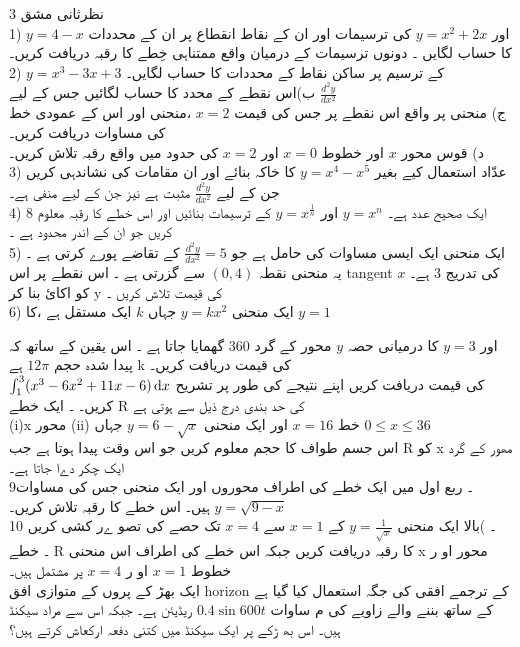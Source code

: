 نظرثانی مشق 3\\

1) 
\(y=4-x\)
اور
\(y=x^{2}+2x\)
کی ترسیمات اور ان کے نقاط انقطاع پر ان کے محددات کا حساب لگایں ۔
دونوں ترسیمات کے درمیان واقع ممتناہی خِطے کا رقبہ دریافت کریں۔\\
2)
\( y=x^{3}-3x+3\) 
کے ترسیم پر ساکن نقاط کے محددات کا حساب لگایں۔\\
ب)اس نقطے کے محدد کا حساب لگائیں جس کے لیے
\(\frac{d^{2}y}{dx^{2}}\)\\
ج) منحنی پر واقع اس نقطے پر جس کی قیمت
\( x=2\)
 ،منحنی اور اس کے عمودی خط کی مساوات دریافت کریں۔\\
 د)  قوس محور
\(x\)
اور خطوط
\(x=0\)
 اور
\(x=2\)
کی حدود میں واقع رقبہ تلاش کریں۔ \\
3)   عدّاد استعمال کیے بغیر 
\(y=x^4-x^5\)
کا خاکہ بنائے اور ان مقامات کی نشاندہی کریں جن کے لیے
 \(\frac{d^{2}y}{dx^{2}}\)
مثبت ہے نیز جن کے لیے منفی ہے۔\\
4)
\(8\)
ایک صحیح عدد ہے۔
\(y=x^{n}\)
اور
\(y=x^{\frac{1}{n}}\)
کے ترسیمات بنائیں اور اس خطے کا رقبہ معلوم کریں جو ان کے اندر محدود ہے ۔\\
5) ایک منحنی ایک ایسی مساوات کی حامل ہے جو
\(\frac{d^{2}y}{dx^{2}}=5\)
کے تقاضے پورے کرتی ہے ۔
یہ منحنی نقطہ
\((0,4)\)
سے گزرتی ہے ۔ اس نقطے پر اس
tangent
کی تدریج
\(3\)
ہے۔
\(x\)
 کو اکائ بنا کر y کی قیمت تلاش کریں ۔\\
6) ایک منحنی
\(y=k x^{2}\) 
 جہاں
\(k\)
ایک مستقل ہے ،کا
\(y=1\)

اور
\(y=3\)
کا درمیانی حصہ
\(y\)
محور کے گرد
\(360\)
گھمایا جاتا ہے ۔ اس یقین کے ساتھ کہ پیدا شدہ حجم
\(12 \pi\)  
ہے k کی قیمت دریافت کریں۔\\

\(\int_{1}^{3}(x^{3}-6x^{2}+11x-6)\dif{x}\)
کی قیمت دریافت کریں اپنے نتیجے کی طور پر تشریح کریں۔
۔ ایک خطے
R
کی حد بندی درج ذیل سے ہوتی ہے \\
(i)x
محور 
(ii)
خط
\(x=16\)
اور ایک منحنی
\(y=6-\sqrt{x}\)
جہاں
\(0\le x\le 36\)\\
اس جسم طواف کا حجم معلوم کریں جو اس وقت پیدا ہوتا ہے جب
R
 کو
x
مھور کے گرد ایک چکر دےا جاتا ہے۔\\ 
9۔ ربع اول میں ایک خطے کی اطراف محوروں اور ایک منحنی جس کی مساوات
\(y=\sqrt{9-x}\)
ہیں۔ اس خطے کا رقبہ تلاش کریں۔\\
10 ۔ )بالا ایک منحنی
\(y=\frac{1}{\sqrt{x}}\)
کے
\(x=1\)
سے
\(x=4\)
تک حصے کی تصو ےر کشی کریں\\۔
خطے
R
کا رقبہ 
دریافت کریں جبکہ اس خطے کی اطراف اس منحنی 
x
محور 
او ر
خطوط 
\(x=1\)
او ر
\(x=4\)
پر مشتمل ہیں۔\\
ایک بھڑ کے پروں کے متوازی افق
horizon
کے ترجمے افقی کی جگہ استعمال کیا گیا ہے
کے ساتھ بننے
والے زاویے کی م ساوات
\(0.4\sin{600t}\)
ریڈیئن ہے۔ جبکہ اس سے مراد سیکنڈ ہیں۔ اس بھ ڑکے پر ایک سیکنڈ میں کتنی دفعہ ارکعاش کرتے ہیں؟\\

